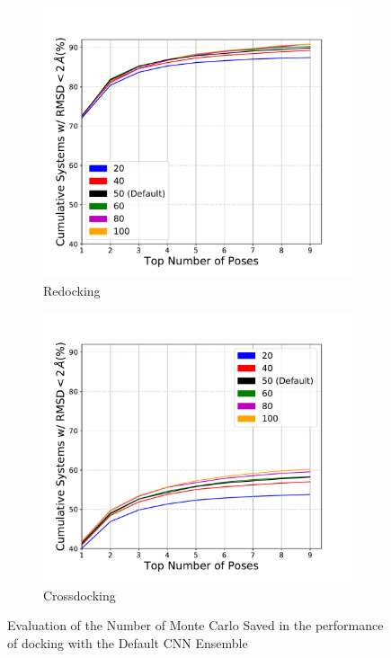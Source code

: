 \documentclass[journal=jcisd8,manuscript=article]{achemso}
\begin{document}
\begin{figure}    
        \begin{subfigure}[b]{0.48\textwidth}    
		\centering
		\includegraphics[width=\textwidth]{figures/redocking/sweep_mcsaved_line.pdf}
		\caption{Redocking}
		\label{fig:mcsaved rd}
        \end{subfigure}    
        \begin{subfigure}[b]{0.48\textwidth}    
		\centering
		\includegraphics[width=\textwidth]{figures/crossdocking/sweep_mcsaved_line.pdf}
		\caption{Crossdocking}
		\label{fig:mcsaved cd}
        \end{subfigure}    
	\caption{Evaluation of the Number of Monte Carlo Saved in the performance of docking with the Default CNN Ensemble}
	\label{fig:mcsaved}
\end{figure}    
\end{document}
